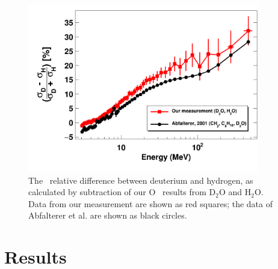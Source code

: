 \begin{figure}[tb]
    \centering
    \includegraphics[width=0.9\textwidth]{figures/relativeDiff_DtoH.png}
    \caption[\tot\ relative difference between deuterium and hydrogen from our measurement]
    {The \tot\ relative difference between deuterium and hydrogen,
        as calculated by subtraction of our O \tot\ results from
        D$_{2}$O and H$_{2}$O. Data from our measurement are shown as red
        squares; the data of Abfalterer et al. \cite{Abfalterer1998} are shown
    as black circles.}
    \label{DtoH}
\end{figure}

\section{Results}
